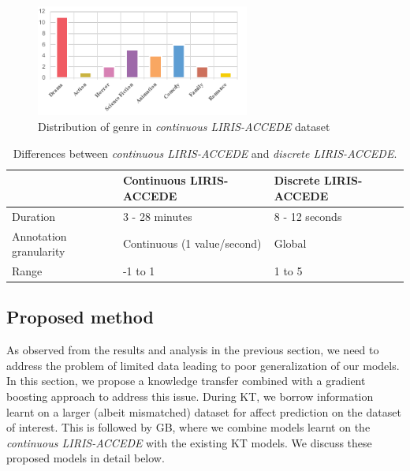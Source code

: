 \documentclass{article}
\begin{document}
\begin{spacing}{0.9}
\begin{figure}[t]
\centering
\vspace{-1mm}
\includegraphics[width=7cm]{genre2}
\vspace{-5mm}
\caption{Distribution of genre in {\it continuous LIRIS-ACCEDE} dataset}
\vspace{-5mm}
\label{genre}
\end{figure}

\begin{table}[t]
\centering
\caption{Differences between {\it continuous LIRIS-ACCEDE} and {\it discrete LIRIS-ACCEDE}.}
\begin{tabular}{l|p{2.2cm}|p{2.2cm}}\hline
				& Continuous LIRIS-ACCEDE	& Discrete LIRIS-ACCEDE \\ \hline
Duration			& 3 - 28 minutes			& 8 - 12 seconds		\\ \hline	
Annotation granularity & Continuous (1 value/second)				& Global 				\\ \hline
Range			& -1 to 1					& 1 to 5				\\ 
\end{tabular}
\vspace{-3mm}
\label{differences}
\end{table}

\vspace{-2mm}
\subsection{Proposed method}
\vspace{-2mm}
As observed from the results and analysis in the previous section, we need to address the problem of limited data leading to poor generalization of our models.
In this section, we propose a knowledge transfer combined with a gradient boosting approach to address this issue.
During KT, we borrow information learnt on a larger (albeit mismatched) dataset for affect prediction on the dataset of interest.
This is followed by GB, where we combine models learnt on the {\it continuous LIRIS-ACCEDE} with the existing KT models.
We discuss these proposed models in detail below. 


\end{spacing}
\end{document}
